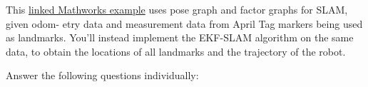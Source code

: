 \documentclass[answers]{exam}
\begin{document}
\begin{questions}
    \question[(Bonus) 20]
    This \href{https://www.mathworks.com/help/nav/ug/landmark-slam-using-apriltag-markers.html}{linked Mathworks example} uses pose graph and factor graphs for SLAM, given odom-
    etry data and measurement data from April Tag markers being used as landmarks. You'll
    instead implement the EKF-SLAM algorithm on the same data, to obtain the locations of all
    landmarks and the trajectory of the robot.

    \begin{solution}
    \end{solution}

    \question[20]
    Answer the following questions individually:
\end{questions}
\end{document}
